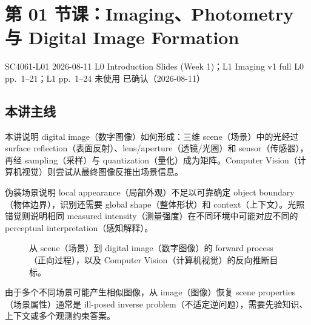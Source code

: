
\section{第 01 节课：Imaging、Photometry 与 Digital Image Formation}
\label{lecture:SC4061-L01}

\lecturemeta
  {SC4061-L01}
  {2026-08-11}
  {L0 Introduction Slides (Week 1)；L1 Imaging v1 full}
  {L0 pp.~1--21；L1 pp.~1--24}
  {未使用}
  {已确认（2026-08-11）}

\subsection{本讲主线}

本讲说明 digital image（数字图像）如何形成：三维 scene（场景）中的光经过 surface reflection（表面反射）、lens/aperture（透镜/光圈）和 sensor（传感器），再经 sampling（采样）与 quantization（量化）成为矩阵。Computer Vision（计算机视觉）则尝试从最终图像反推出场景信息。



伪装场景说明 local appearance（局部外观）不足以可靠确定 object boundary（物体边界），识别还需要 global shape（整体形状）和 context（上下文）。光照错觉则说明相同 measured intensity（测量强度）在不同环境中可能对应不同的 perceptual interpretation（感知解释）。

\begin{figure}[htbp]
  \centering
  \resizebox{\textwidth}{!}{}
  \caption{从 scene（场景）到 digital image（数字图像）的 forward process（正向过程），以及 Computer Vision（计算机视觉）的反向推断目标。}
  \label{fig:sc4061-l01-imaging-pipeline}
\end{figure}

由于多个不同场景可能产生相似图像，从 image（图像）恢复 scene properties（场景属性）通常是 ill-posed inverse problem（不适定逆问题），需要先验知识、上下文或多个观测约束答案。


